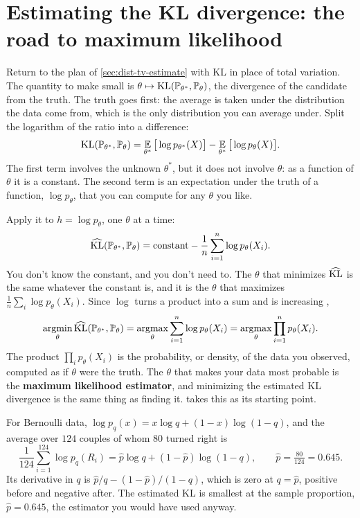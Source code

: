 \section{Estimating the KL divergence: the road to maximum likelihood}
\label{sec:dist-estimating-kl}

Return to the plan of \cref{sec:dist-tv-estimate} with KL in place of total variation.
The quantity to make small is $\theta \mapsto \mathrm{KL}(\mathbb{P}_{\theta^*}, \mathbb{P}_\theta)$, the divergence of the candidate from the truth.
The truth goes first: the average is taken under the distribution the data come from, which is the only distribution you can average under.
Split the logarithm of the ratio into a difference:
\[
\mathrm{KL}(\mathbb{P}_{\theta^*}, \mathbb{P}_\theta) = \operatorname*{\mathbb{E}}_{\theta^*}\big[\log p_{\theta^*}(X)\big] - \operatorname*{\mathbb{E}}_{\theta^*}\big[\log p_\theta(X)\big].
\]
The first term involves the unknown $\theta^*$, but it does not involve $\theta$: as a function of $\theta$ it is a constant.
The second term is an expectation under the truth of a function, $\log p_\theta$, that you can compute for any $\theta$ you like.


Apply it to $h = \log p_\theta$, one $\theta$ at a time:
\[
\widehat{\mathrm{KL}}(\mathbb{P}_{\theta^*}, \mathbb{P}_\theta) = \text{constant} - \frac1n \sum_{i=1}^n \log p_\theta(X_i).
\]
You don't know the constant, and you don't need to.
The $\theta$ that minimizes $\widehat{\mathrm{KL}}$ is the same whatever the constant is, and it is the $\theta$ that maximizes $\frac1n \sum_i \log p_\theta(X_i)$.
Since $\log$ turns a product into a sum and is increasing ,
\[
\operatorname*{argmin}_\theta \widehat{\mathrm{KL}}(\mathbb{P}_{\theta^*}, \mathbb{P}_\theta) = \operatorname*{argmax}_\theta \sum_{i=1}^n \log p_\theta(X_i) = \operatorname*{argmax}_\theta \prod_{i=1}^n p_\theta(X_i).
\]
The product $\prod_i p_\theta(X_i)$ is the probability, or density, of the data you observed, computed as if $\theta$ were the truth.
The $\theta$ that makes your data most probable is the \textbf{maximum likelihood estimator}, and minimizing the estimated KL divergence is the same thing as finding it.
 takes this as its starting point.

\begin{worked}
For Bernoulli data, $\log p_q(x) = x \log q + (1 - x)\log(1 - q)$, and the average over $124$ couples of whom $80$ turned right is
\[
\frac{1}{124}\sum_{i=1}^{124} \log p_q(R_i) = \hat{p} \log q + (1 - \hat{p}) \log(1 - q), \qquad \hat{p} = \tfrac{80}{124} = 0.645.
\]
Its derivative in $q$ is $\hat{p}/q - (1 - \hat{p})/(1 - q)$, which is zero at $q = \hat{p}$, positive before and negative after.
The estimated KL is smallest at the sample proportion, $\hat{p} = 0.645$, the estimator you would have used anyway.
\end{worked}

